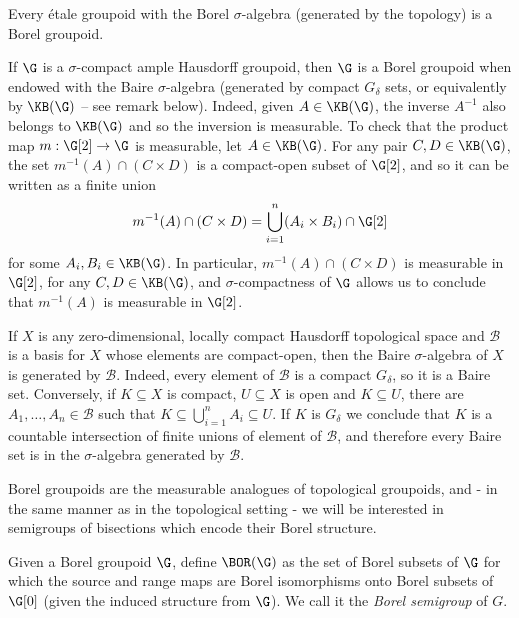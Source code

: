 \begin{example}
Every étale groupoid with the Borel $\sigma$-algebra (generated by the topology) is a Borel groupoid.
\end{example}

\begin{example}\label{examplesigmacompactampleisborel}
If $\G$ is a $\sigma$-compact ample Hausdorff groupoid, then $\G$ is a Borel groupoid when endowed with the Baire $\sigma$-algebra (generated by compact $G_\delta$ sets, or equivalently by $\KB(\G)$ -- see remark below). Indeed, given $A\in\KB(\G)$, the inverse $A^{-1}$ also belongs to $\KB(\G)$ and so the inversion is measurable. To check that the product map $m:\G[2]\to \G$ is measurable, let $A\in\KB(\G)$. For any pair $C,D\in\KB(\G)$, the set $m^{-1}(A)\cap(C\times D)$ is a compact-open subset of $\G[2]$, and so it can be written as a finite union
\[m^{-1}(A)\cap(C\times D)=\bigcup_{i=1}^n(A_i\times B_i)\cap\G[2]\]
for some $A_i,B_i\in\KB(\G)$. In particular, $m^{-1}(A)\cap(C\times D)$ is measurable in $\G[2]$, for any $C,D\in\KB(\G)$, and $\sigma$-compactness of $\G$ allows us to conclude that $m^{-1}(A)$ is measurable in $\G[2]$.
\end{example}

\begin{remark}
If $X$ is any zero-dimensional, locally compact Hausdorff topological space and $\mathcal{B}$ is a basis for $X$ whose elements are compact-open, then the Baire $\sigma$-algebra of $X$ is generated by $\mathcal{B}$. Indeed, every element of $\mathcal{B}$ is a compact $G_\delta$, so it is a Baire set. Conversely, if $K\subseteq X$ is compact, $U\subseteq X$ is open and $K\subseteq U$, there are $A_1,\ldots,A_n\in\mathcal{B}$ such that $K\subseteq\bigcup_{i=1}^n A_i\subseteq U$. If $K$ is $G_\delta$ we conclude that $K$ is a countable intersection of finite unions of element of $\mathcal{B}$, and therefore every Baire set is in the $\sigma$-algebra generated by $\mathcal{B}$.
\end{remark}

Borel groupoids are the measurable analogues of topological groupoids, and - in the same manner as in the topological setting - we will be interested in semigroups of bisections which encode their Borel structure.

\begin{definition}
Given a Borel groupoid $\G$, define $\BOR(\G)$ as the set of Borel subsets of $\G$ for which the source and range maps are Borel isomorphisms onto Borel subsets of $\G[0]$ (given the induced structure from $\G$). We call it the \emph{Borel semigroup} of $G$.
\end{definition}

